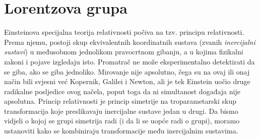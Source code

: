\section{Lorentzova grupa}
\label{sec:lorentz}

Einsteinova specijalna teorija relativnosti počiva na tzv.
principu relativnosti. Prema njemu, postoji skup ekvivalentnih koordinatnih
sustava (zvanih \emph{inercijalni sustavi})
u međusobnom jednolikom pravocrtnom gibanju, a u kojima fizikalni zakoni i pojave
izgledaju isto. Promatrač ne može eksperimentalno detektirati da 
se giba, ako se giba jednoliko. Mirovanje nije apsolutno,
čega su na ovaj ili onaj način bili svjesni već Kopernik, Galilei i Newton, ali je
tek Einstein uočio druge radikalne posljedice ovog načela, poput toga
da ni simultanost događaja nije apsolutna.
Princip relativnosti je princip simetrije na troparametarski skup transformacija
koje preslikavaju inercijalne sustave jedan u drugi.
Da bismo vidjeli o kojoj se grupi simetrija radi (i da li se uopće radi o grupi),
moramo ustanoviti kako se kombiniraju transformacije među inercijalnim sustavima.

